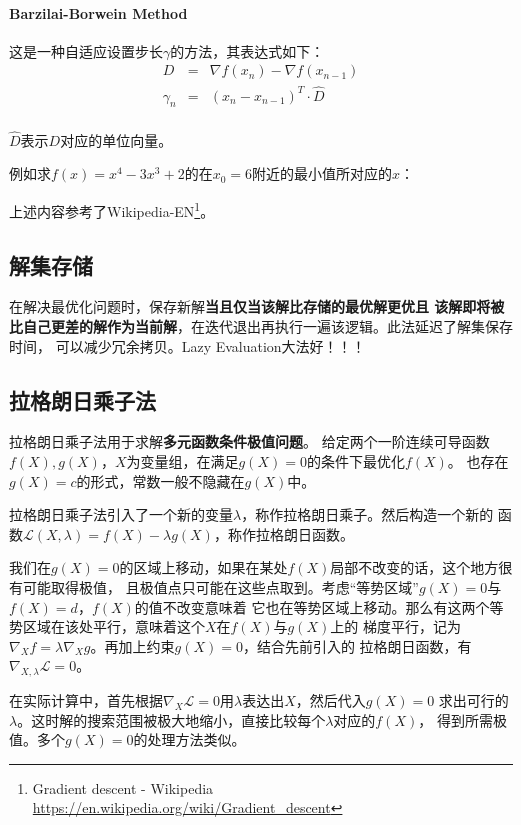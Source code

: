 \paragraph{Barzilai-Borwein Method}
这是一种自适应设置步长$\gamma$的方法，其表达式如下：
\begin{eqnarray*}
	D&=&\nabla f(x_n)-\nabla f(x_{n-1})\\
	\gamma_n&=&(x_n-x_{n-1})^T\cdot \hat{D}\\
\end{eqnarray*}

$\hat{D}$表示$D$对应的单位向量。

例如求$f(x)=x^4-3x^3+2$的在$x_0=6$附近的最小值所对应的$x$：



上述内容参考了Wikipedia-EN\footnote{
	Gradient descent - Wikipedia
	\url{https://en.wikipedia.org/wiki/Gradient\_descent}
}。
\subsection{解集存储}
在解决最优化问题时，保存新解{\bfseries 当且仅当该解比存储的最优解更优且
该解即将被比自己更差的解作为当前解}，在迭代退出再执行一遍该逻辑。此法延迟了解集保存时间，
可以减少冗余拷贝。Lazy Evaluation大法好！！！
\subsection{拉格朗日乘子法}
拉格朗日乘子法用于求解{\bfseries 多元函数条件极值问题}。
给定两个一阶连续可导函数$f(X),g(X)$，$X$为变量组，在满足$g(X)=0$的条件下最优化$f(X)$。
也存在$g(X)=c$的形式，常数一般不隐藏在$g(X)$中。

拉格朗日乘子法引入了一个新的变量$\lambda$，称作拉格朗日乘子。然后构造一个新的
函数$\mathcal{L}(X,\lambda)=f(X)-\lambda g(X)$，称作拉格朗日函数。

我们在$g(X)=0$的区域上移动，如果在某处$f(X)$局部不改变的话，这个地方很有可能取得极值，
且极值点只可能在这些点取到。考虑``等势区域''$g(X)=0$与$f(X)=d$，$f(X)$的值不改变意味着
它也在等势区域上移动。那么有这两个等势区域在该处平行，意味着这个$X$在$f(X)$与$g(X)$上的
梯度平行，记为$\nabla_X f=\lambda \nabla_X g$。再加上约束$g(X)=0$，结合先前引入的
拉格朗日函数，有$\nabla_{X,\lambda} \mathcal{L}=0$。

在实际计算中，首先根据$\nabla_X \mathcal{L}=0$用$\lambda$表达出$X$，然后代入$g(X)=0$
求出可行的$\lambda$。这时解的搜索范围被极大地缩小，直接比较每个$\lambda$对应的$f(X)$，
得到所需极值。多个$g(X)=0$的处理方法类似。

